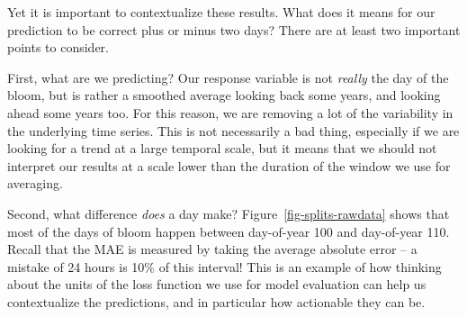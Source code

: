 \documentclass[
  letterpaper,
]{scrbook}
\begin{document}
Yet it is important to contextualize these results. What does it means
for our prediction to be correct plus or minus two days? There are at
least two important points to consider.

\begin{table}

\caption{\label{tbl-splits-performance-summary}TODO}


\end{table}%

First, what are we predicting? Our response variable is not
\emph{really} the day of the bloom, but is rather a smoothed average
looking back some years, and looking ahead some years too. For this
reason, we are removing a lot of the variability in the underlying time
series. This is not necessarily a bad thing, especially if we are
looking for a trend at a large temporal scale, but it means that we
should not interpret our results at a scale lower than the duration of
the window we use for averaging.

Second, what difference \emph{does} a day make?
Figure~\ref{fig-splits-rawdata} shows that most of the days of bloom
happen between day-of-year 100 and day-of-year 110. Recall that the MAE
is measured by taking the average absolute error -- a mistake of 24
hours is 10\% of this interval! This is an example of how thinking about
the units of the loss function we use for model evaluation can help us
contextualize the predictions, and in particular how actionable they can
be.
\end{document}
